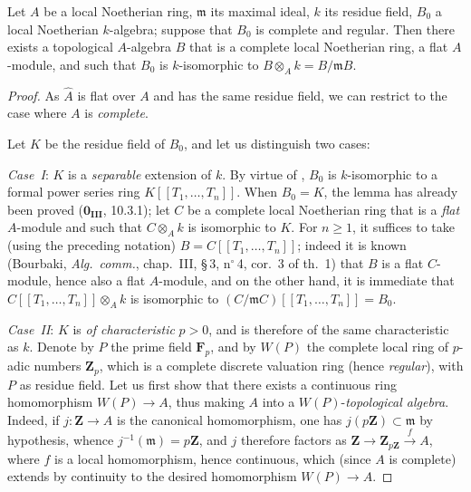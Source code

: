 \begin{lemma}[19.7.1.3]
\label{0.19.7.1.3}
Let $A$ be a local Noetherian ring, $\mathfrak{m}$ its maximal ideal, $k$ its residue field, $B_0$ a local Noetherian $k$-algebra; suppose that $B_0$ is complete and \textup{regular}.
Then there exists a topological $A$-algebra $B$ that is a complete local Noetherian ring, a \textup{flat} $A$-module, and such that $B_0$ is $k$-isomorphic to $B\otimes_A k = B/\mathfrak{m}B$.
\end{lemma}

\begin{proof}
As $\widehat{A}$ is flat over $A$ and has the same residue field, we can restrict to the case where $A$ is \emph{complete}.

Let $K$ be the residue field of $B_0$, and let us distinguish two cases:

\medskip
\noindent\emph{Case~I}: $K$ is a \emph{separable} extension of $k$.
By virtue of , $B_0$ is $k$-isomorphic to a formal power series ring $K[[T_1,\ldots,T_n]]$.
When $B_0=K$, the lemma has already been proved ($\mathbf{0_{III}}$, 10.3.1); let $C$ be a complete local Noetherian ring that is a \emph{flat} $A$-module and such that $C\otimes_A k$ is isomorphic to $K$.
For $n\geq 1$, it suffices to take (using the preceding notation) $B=C[[T_1,\ldots,T_n]]$; indeed it is known (Bourbaki, \emph{Alg.\ comm.}, chap.~III, \S\,3, n$^\circ$\,4, cor.~3 of th.~1) that $B$ is a flat $C$-module, hence also a flat $A$-module, and on the other hand, it is immediate that $C[[T_1,\ldots,T_n]]\otimes_A k$ is isomorphic to $(C/\mathfrak{m}C)[[T_1,\ldots,T_n]]=B_0$.

\medskip
\noindent\emph{Case~II}: $K$ is \emph{of characteristic} $p>0$, and is therefore of the same characteristic as $k$.
Denote by $P$ the prime field $\mathbf{F}_p$, and by $W(P)$ the complete local ring of $p$-adic numbers $\mathbf{Z}_p$, which is a complete discrete valuation ring (hence \emph{regular}), with $P$ as residue field.
Let us first show that there exists a continuous ring homomorphism $W(P)\to A$, thus making $A$ into a $W(P)$-\emph{topological algebra}.
Indeed, if $j:\mathbf{Z}\to A$ is the canonical homomorphism, one has $j(p\mathbf{Z})\subset\mathfrak{m}$ by hypothesis, whence $j^{-1}(\mathfrak{m})=p\mathbf{Z}$, and $j$ therefore factors as $\mathbf{Z}\to\mathbf{Z}_{p\mathbf{Z}}\xrightarrow{f}A$, where $f$ is a local homomorphism, hence continuous, which (since $A$ is complete) extends by continuity to the desired homomorphism $W(P)\to A$.


\end{proof}
